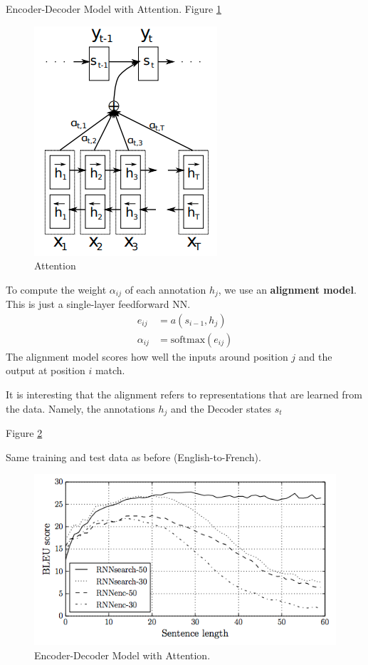 \documentclass[english]{article}
\begin{document}
\item 
 {Encoder-Decoder Model with Attention}.  Figure \ref{Attention}

\begin{figure}
\centering
\includegraphics[height=0.35\linewidth]{attention.png}
\caption{Attention}
\label{Attention}
\end{figure}
To compute the weight $\alpha_{ij}$ of each annotation $h_j$, we use an \textbf{alignment model}. This is just a single-layer feedforward NN.
\begin{align*}
e_{ij} &= a(s_{i-1}, h_j)\\
\alpha_{ij} &= \text{softmax}(e_{ij})
\end{align*}
The alignment model scores how well the inputs around position $j$ and the output at position $i$ match.

It is interesting that the alignment refers to representations that are learned from the data. Namely, the annotations $h_j$ and the Decoder states $s_t$

\item   Figure \ref{Encoder-Decoder Model with Attention}

Same training and test data as before (English-to-French).

\begin{figure}
\centering
\includegraphics[height=0.4\linewidth]{attention-encdec.png}
    \caption{Encoder-Decoder Model with Attention.}
    \label{Encoder-Decoder Model with Attention}
\end{figure}
\end{document}
